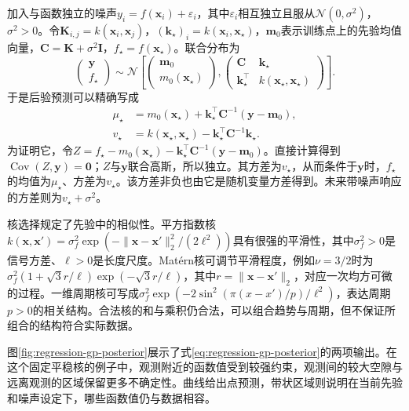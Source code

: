 加入与函数独立的噪声$y_i=f(\bm{x}_i)+\varepsilon_i$，其中$\varepsilon_i$相互独立且服从$\mathcal{N}(0,\sigma^2)$，$\sigma^2>0$。令$\bm{K}_{i,j}=k(\bm{x}_i,\bm{x}_j)$，$(\bm{k}_{\star})_i=k(\bm{x}_i,\bm{x}_{\star})$，$\bm{m}_0$表示训练点上的先验均值向量，$\bm{C}=\bm{K}+\sigma^2\bm{I}$，$f_{\star}=f(\bm{x}_{\star})$。联合分布为
\[
  \begin{pmatrix}\bm{y}\\f_{\star}\end{pmatrix}
  \sim\mathcal{N}\!\left[
    \begin{pmatrix}\bm{m}_0\\m_0(\bm{x}_{\star})\end{pmatrix},
    \begin{pmatrix}
      \bm{C}&\bm{k}_{\star}\\
      \bm{k}_{\star}^{\top}&k(\bm{x}_{\star},\bm{x}_{\star})
    \end{pmatrix}\right].
\]
于是后验预测可以精确写成
\begin{equation}
  \begin{aligned}
    \mu_{\star}
      &=m_0(\bm{x}_{\star})
        +\bm{k}_{\star}^{\top}\bm{C}^{-1}(\bm{y}-\bm{m}_0),\\
    v_{\star}
      &=k(\bm{x}_{\star},\bm{x}_{\star})
        -\bm{k}_{\star}^{\top}\bm{C}^{-1}\bm{k}_{\star}.
  \end{aligned}
  \label{eq:regression-gp-posterior}
\end{equation}
为证明它，令$Z=f_{\star}-m_0(\bm{x}_{\star})-\bm{k}_{\star}^{\top}\bm{C}^{-1}(\bm{y}-\bm{m}_0)$。直接计算得到$\operatorname{Cov}(Z,\bm{y})=\bm{0}$；$Z$与$\bm{y}$联合高斯，所以独立。其方差为$v_{\star}$，从而条件于$\bm{y}$时，$f_{\star}$的均值为$\mu_{\star}$、方差为$v_{\star}$。该方差非负也由它是随机变量方差得到。未来带噪声响应的方差则为$v_{\star}+\sigma^2$。

核选择规定了先验中的相似性。平方指数核$k(\bm{x},\bm{x}')=\sigma_f^2\exp(-\lVert\bm{x}-\bm{x}'\rVert_2^2/(2\ell^2))$具有很强的平滑性，其中$\sigma_f^2>0$是信号方差、$\ell>0$是长度尺度。Matérn核可调节平滑程度，例如$\nu=3/2$时为$\sigma_f^2(1+\sqrt3r/\ell)\exp(-\sqrt3r/\ell)$，其中$r=\lVert\bm{x}-\bm{x}'\rVert_2$，对应一次均方可微的过程。一维周期核可写成$\sigma_f^2\exp(-2\sin^2(\pi(x-x')/p)/\ell^2)$，表达周期$p>0$的相关结构。合法核的和与乘积仍合法，可以组合趋势与周期，但不保证所组合的结构符合实际数据。

图\ref{fig:regression-gp-posterior}展示了式\eqref{eq:regression-gp-posterior}的两项输出。在这个固定平稳核的例子中，观测附近的函数值受到较强约束，观测间的较大空隙与远离观测的区域保留更多不确定性。曲线给出点预测，带状区域则说明在当前先验和噪声设定下，哪些函数值仍与数据相容。

